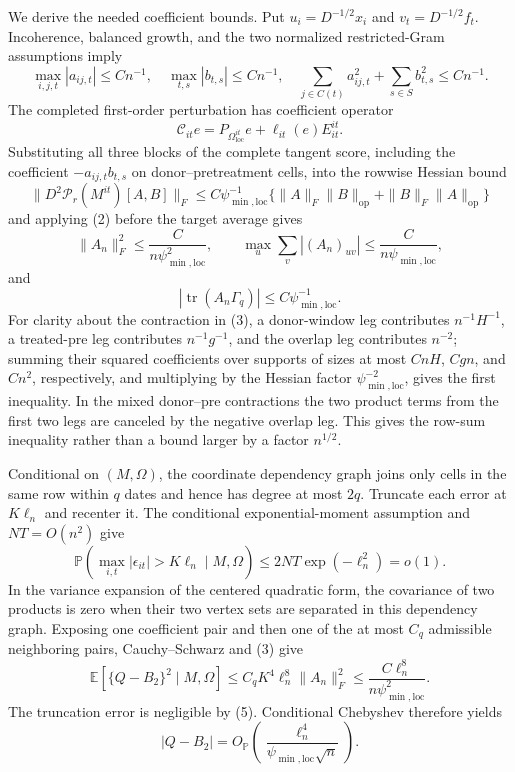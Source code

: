 We derive the needed coefficient bounds.  Put \(u_i=D^{-1/2}x_i\) and \(v_t=D^{-1/2}f_t\).  Incoherence, balanced growth, and the two normalized restricted-Gram assumptions imply
\[
 \max_{i,j,t}|a_{ij,t}|\le Cn^{-1},
 \quad \max_{t,s}|b_{t,s}|\le Cn^{-1},
 \quad
 \sum_{j\in C(t)}a_{ij,t}^2+
 \sum_{s\in S}b_{t,s}^2\le Cn^{-1}.
 \tag{2}
\]
The completed first-order perturbation has coefficient operator
\[
 \mathcal C_{it}e
 =P_{\Omega_{\mathrm{loc}}^{it}}e
  +\ell_{it}(e)E^{it}_{it}.
\]
Substituting all three blocks of the complete tangent score, including the coefficient \(-a_{ij,t}b_{t,s}\) on donor--pretreatment cells, into the rowwise Hessian bound
\[
 \|D^2\mathcal P_r(M^{it})[A,B]\|_F
 \le C\psi_{\min,\mathrm{loc}}^{-1}
 \{\|A\|_F\|B\|_{\mathrm{op}}+\|B\|_F\|A\|_{\mathrm{op}}\}
\]
and applying (2) before the target average gives
\[
 \|A_n\|_F^2\le\frac{C}{n\psi_{\min,\mathrm{loc}}^2},
 \qquad
 \max_u\sum_v|(A_n)_{uv}|
 \le\frac{C}{n\psi_{\min,\mathrm{loc}}},
 \tag{3}
\]
and
\[
 |\operatorname{tr}(A_n\Gamma_q)|
 \le C\psi_{\min,\mathrm{loc}}^{-1}.
 \tag{4}
\]
For clarity about the contraction in (3), a donor-window leg contributes \(n^{-1}H^{-1}\), a treated-pre leg contributes \(n^{-1}g^{-1}\), and the overlap leg contributes \(n^{-2}\); summing their squared coefficients over supports of sizes at most \(CnH\), \(Cgn\), and \(Cn^2\), respectively, and multiplying by the Hessian factor \(\psi_{\min,\mathrm{loc}}^{-2}\), gives the first inequality.  In the mixed donor--pre contractions the two product terms from the first two legs are canceled by the negative overlap leg.  This gives the row-sum inequality rather than a bound larger by a factor \(n^{1/2}\).

Conditional on \((M,\Omega)\), the coordinate dependency graph joins only cells in the same row within \(q\) dates and hence has degree at most \(2q\).  Truncate each error at \(K\ell_n\) and recenter it.  The conditional exponential-moment assumption and \(NT=O(n^2)\) give
\[
 \mathbb P\!\left(\max_{i,t}|\epsilon_{it}|>K\ell_n\mid M,\Omega\right)
 \le 2NT\exp(-\ell_n^2)=o(1).
 \tag{5}
\]
In the variance expansion of the centered quadratic form, the covariance of two products is zero when their two vertex sets are separated in this dependency graph.  Exposing one coefficient pair and then one of the at most \(C_q\) admissible neighboring pairs, Cauchy--Schwarz and (3) give
\[
 \mathbb E\!\left[
 \{Q-B_2\}^2\mid M,\Omega\right]
 \le C_qK^4\ell_n^8\|A_n\|_F^2
 \le\frac{C\ell_n^8}{n\psi_{\min,\mathrm{loc}}^2}.
 \tag{6}
\]
The truncation error is negligible by (5).  Conditional Chebyshev therefore yields
\[
 |Q-B_2|=O_{\mathbb P}\!\left(
 \frac{\ell_n^4}{\psi_{\min,\mathrm{loc}}\sqrt n}\right).
 \tag{7}
\]

